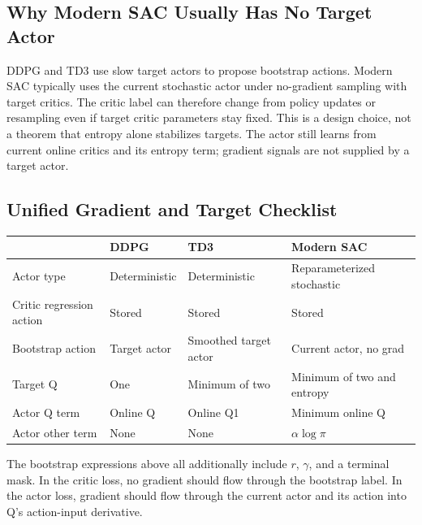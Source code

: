 \subsection{Why Modern SAC Usually Has No Target Actor}
DDPG and TD3 use slow target actors to propose bootstrap actions. Modern SAC typically uses the current stochastic actor under no-gradient sampling with target critics. The critic label can therefore change from policy updates or resampling even if target critic parameters stay fixed. This is a design choice, not a theorem that entropy alone stabilizes targets. The actor still learns from current online critics and its entropy term; gradient signals are not supplied by a target actor.

\subsection{Unified Gradient and Target Checklist}
\begin{center}\small
\begin{tabularx}{\textwidth}{@{}lXXX@{}}\toprule
& DDPG & TD3 & Modern SAC\\\midrule
Actor type & Deterministic & Deterministic & Reparameterized stochastic\\
Critic regression action & Stored & Stored & Stored\\
Bootstrap action & Target actor & Smoothed target actor & Current actor, no grad\\
Target Q & One & Minimum of two & Minimum of two and entropy\\
Actor Q term & Online Q & Online Q1 & Minimum online Q\\
Actor other term & None & None & $\alpha\log\pi$\\\bottomrule
\end{tabularx}
\end{center}
The bootstrap expressions above all additionally include $r$, $\gamma$, and a terminal mask. In the critic loss, no gradient should flow through the bootstrap label. In the actor loss, gradient should flow through the current actor and its action into Q's action-input derivative.

